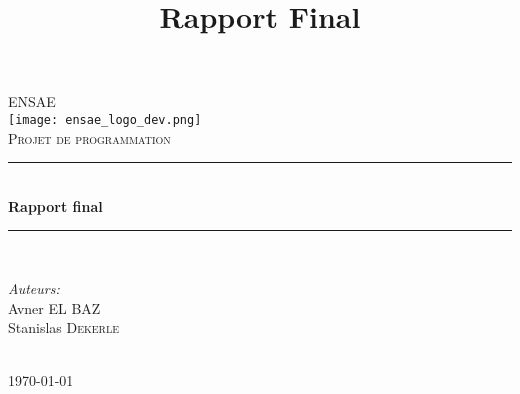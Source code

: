 \documentclass[12pt]{article}
\title{Rapport Final}
\begin{document}
\begin{titlepage}

\newcommand{\HRule}{\rule{\linewidth}{0.5mm}} %

\center %
 

\textsc{\LARGE ENSAE}\\[1.5cm] %
\texttt{[image: ensae\_logo\_dev.png]}\\[1cm] %
\textsc{\Large Projet de programmation}\\[0.5cm] %


\HRule \\[0.4cm]
{ \huge \bfseries Rapport final}\\[0.4cm] %
\HRule \\[1.5cm]
 

\begin{minipage}{0.4\textwidth}
\begin{flushleft} \large
\emph{Auteurs:}\\
Avner \textsc{EL BAZ}\\ %
Stanislas \textsc{Dekerle}\\ %
\end{flushleft}

\end{minipage}\\[2cm]



{\large \today}\\[2cm] %

\vfill %

\end{titlepage}
\end{document}
